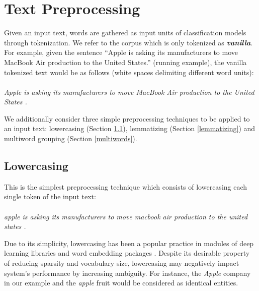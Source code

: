 \documentclass[11pt,a4paper]{article}
\begin{document}
\section{Text Preprocessing}
\label{preprocessing}

Given an input text, words are gathered as input units of classification models through tokenization. We refer to the corpus which is only tokenized as \textit{\textbf{vanilla}}. For example, given the sentence ``Apple is asking its manufacturers to move MacBook Air production to the United States.'' (running example), the vanilla tokenized text would be as follows (white spaces delimiting different word units): 

\paragraph{} 
\textit{Apple is asking its manufacturers to move MacBook Air production to the United States .}
\newline

We additionally consider three simple preprocessing techniques to be applied to an input text: lowercasing (Section \ref{lowercasing}), lemmatizing (Section \ref{lemmatizing}) and multiword grouping (Section \ref{multiwords}).



\subsection{Lowercasing}
\label{lowercasing}


This is the simplest preprocessing technique which consists of lowercasing each single token of the input text: 

\paragraph{} 
\textit{apple is asking its manufacturers to move macbook air production to the united states .}
\newline

Due to its simplicity, lowercasing has been a popular practice in modules 
of deep learning libraries and word embedding packages \cite{pennington2014glove,faruqui2014retrofitting}. 
Despite its desirable property of reducing sparsity and vocabulary size, lowercasing may negatively impact system's performance by increasing ambiguity. For instance, the \textit{Apple} company in our example and the \textit{apple} fruit would be considered as identical entities. 
\end{document}
